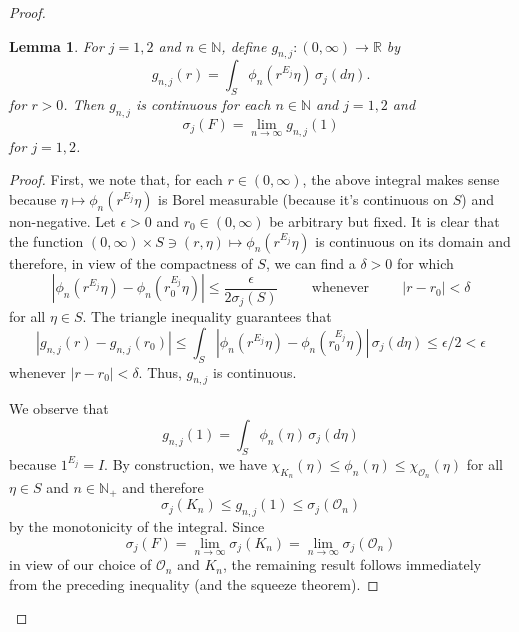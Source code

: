 \documentclass[11pt, letter]{book}
\newtheorem{lemma}[theorem]{Lemma}
\newcommand*{\myproofname}{Proof}
\newenvironment{subproof}[1][\myproofname]{\begin{proof}[#1]\renewcommand*{\qedsymbol}{$\mathbin{/\mkern-6mu/}$}}{\end{proof}}
\begin{document}
\begin{proof}
\begin{lemma}\label{lem:IndepProof}
For $j=1,2$ and $n\in\mathbb{N}$, define $g_{n,j}:(0,\infty)\to\mathbb{R}$ by
\begin{equation*}
g_{n,j}(r)=\int_S\phi_n(r^{E_j}\eta)\,\sigma_j(d\eta).
\end{equation*}
for $r>0$. Then $g_{n,j}$ is continuous for each $n\in\mathbb{N}$ and $j=1,2$ and
\begin{equation*}
    \sigma_j(F)=\lim_{n\to\infty}g_{n,j}(1)
\end{equation*}
for $j=1,2$.
\end{lemma}
\begin{subproof}
First, we note that, for each $r\in (0,\infty)$, the above integral makes sense because $\eta\mapsto \phi_n(r^{E_j}\eta)$ is Borel measurable (because it's continuous on $S$) and non-negative. Let $\epsilon>0$ and $r_0\in (0,\infty)$ be arbitrary but fixed. It is clear that the function $(0,\infty)\times S\ni (r,\eta)\mapsto \phi_n(r^{E_j}\eta)$ is continuous on its domain and therefore, in view of the compactness of $S$, we can find a $\delta>0$ for which
\begin{equation*}
|\phi_n(r^{E_j}\eta)-\phi_n(r_0^{E_j}\eta)|\leq\frac{\epsilon}{2\sigma_j(S)}\hspace{1cm}\mbox{whenever}\hspace{1cm}|r-r_0|<\delta
\end{equation*}
for all $\eta\in S$. The triangle inequality guarantees that
\begin{equation*}
|g_{n,j}(r)-g_{n,j}(r_0)|\leq \int_S|\phi_n(r^{E_j}\eta)-\phi_n(r_0^{E_j}\eta)|\,\sigma_j(d \eta)\leq\epsilon/2<\epsilon
\end{equation*}
whenever $|r-r_0|<\delta$. Thus, $g_{n,j}$ is continuous.

We observe that
\begin{equation*}
g_{n,j}(1)=\int_{S}\phi_n(\eta)\,\sigma_j(d\eta)
\end{equation*}
because $1^{E_j}=I$. By construction, we have $\chi_{K_n}(\eta)\leq\phi_{n}(\eta)\leq \chi_{\mathcal{O}_n}(\eta)$ for all $\eta\in S$ and $n\in\mathbb{N}_+$ and therefore
\begin{equation*}
\sigma_j(K_n)\leq g_{n,j}(1)\leq \sigma_j(\mathcal{O}_n)
\end{equation*}
by the monotonicity of the integral. Since
\begin{equation*}
\sigma_j(F)=\lim_{n\to\infty}\sigma_j(K_n)=\lim_{n\to\infty}\sigma_j(\mathcal{O}_n)
\end{equation*}
in view of our choice of $\mathcal{O}_n$ and $K_n$, the remaining result follows immediately from the preceding inequality (and the squeeze theorem).
\end{subproof}


\end{proof}
\end{document}
